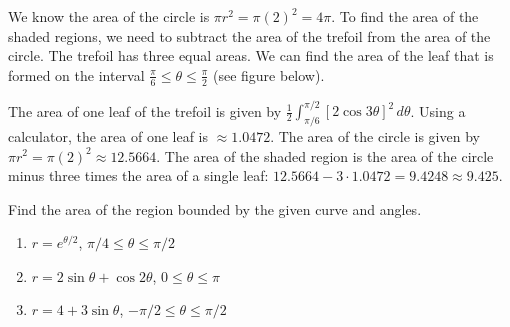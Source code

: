 \begin{Answer}[ref = polar2]
We know the area of the circle is $\pi r^2 = \pi(2)^2 = 4\pi$. To find the 
area of the shaded regions, we need to subtract the area of the trefoil from 
the area of the circle. The trefoil has three equal areas. We can find the 
area of the leaf that is formed on the interval $\frac{\pi}{6} \leq \theta 
\leq \frac{\pi}{2}$ (see figure below).

\begin{center}
\end{center}

The area of one leaf of the trefoil is given by $\frac{1}{2} \int_{\pi/6}^{
\pi/2} \left[2\cos{3\theta} \right]^2\,d\theta$. Using a calculator, the area 
of one leaf is $\approx 1.0472$. The area of the circle is given by $\pi r^2 = 
\pi (2)^2 \approx 12.5664$. The area of the shaded region is the area of 
the circle minus three times the area of a single leaf: $12.5664 - 3 \cdot 
1.0472 = 9.4248 \approx 9.425$. 
\end{Answer}

\begin{Exercise}[label = polar4]
Find the area of the region bounded by the given curve and angles. 
\begin{enumerate}
\item $r = e^{\theta/2}$, $\pi/4 \leq \theta \leq \pi/2$
\item $r = 2\sin{\theta} + \cos{2\theta}$, $0 \leq \theta \leq \pi$
\item $r = 4 + 3\sin{\theta}$, $-\pi/2 \leq \theta \leq \pi/2$
\end{enumerate}
\vspace{100mm}
\end{Exercise}


